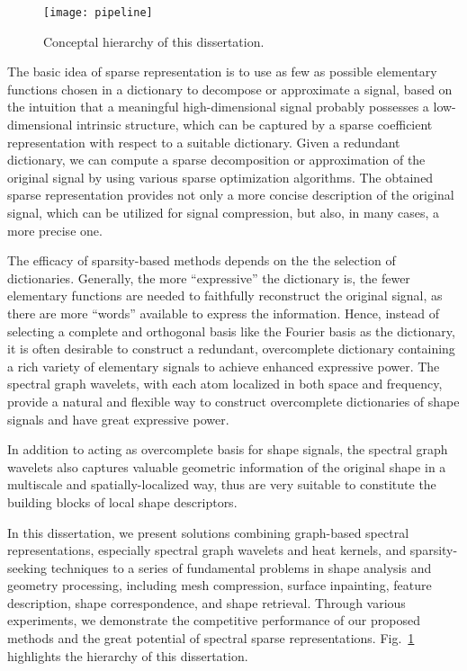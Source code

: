 \begin{figure}
  \centering
  \texttt{[image: pipeline]}
  \caption[Hierarchy of this dissertation]
  {Conceptal hierarchy of this dissertation.}
  \label{fig:thesis_hierarchy}
\end{figure}

The basic idea of sparse representation is to use as few as possible elementary functions chosen
in a dictionary to decompose or approximate a signal, based on the intuition that a meaningful
high-dimensional signal probably possesses a low-dimensional intrinsic structure, which can be
captured by a sparse coefficient representation with respect to a suitable dictionary. Given a
redundant dictionary, we can compute a sparse decomposition or approximation of the original signal
by using various sparse optimization algorithms. The obtained sparse representation provides not
only a more concise description of the original signal, which can be utilized for signal compression,
but also, in many cases, a more precise one.

The efficacy of sparsity-based methods depends on the the selection of dictionaries.
Generally, the more ``expressive'' the dictionary is, the fewer elementary functions
are needed to faithfully reconstruct the original signal, as there are more ``words''
available to express the information. Hence, instead of selecting a complete and orthogonal basis
like the Fourier basis as the dictionary, it is often desirable to construct a redundant,
overcomplete dictionary containing a rich variety of elementary signals to achieve enhanced expressive power.
The spectral graph wavelets, with each atom localized in both space and frequency, provide a
natural and flexible way to construct overcomplete dictionaries of shape signals and have great expressive power.

In addition to acting as overcomplete basis for shape signals, the spectral graph wavelets also captures
valuable geometric information of the original shape in a multiscale and spatially-localized way,
thus are very suitable to constitute the building blocks of local shape descriptors. 

In this dissertation, we present solutions combining graph-based spectral representations,
especially spectral graph wavelets and heat kernels, and sparsity-seeking techniques to a series 
of fundamental problems in shape analysis and geometry processing, including mesh compression, 
surface inpainting, feature description, shape correspondence, and shape retrieval. 
Through various experiments, we demonstrate the competitive performance of our proposed methods and the great potential of 
spectral sparse representations. Fig.~\ref{fig:thesis_hierarchy} highlights the hierarchy of this dissertation. 


